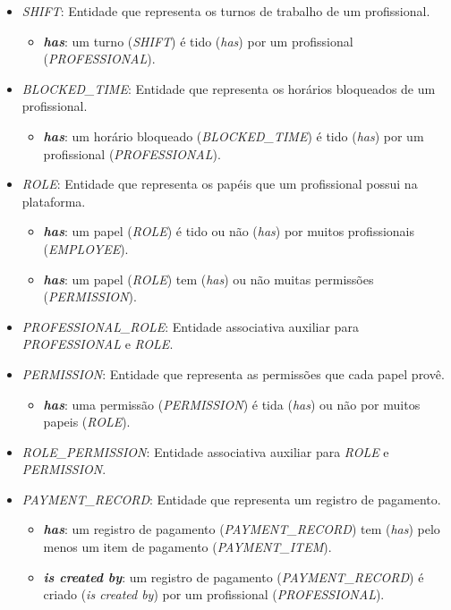 \begin{itemize}
	\item \emph{SHIFT}: Entidade que representa os turnos de trabalho de um profissional.
	\begin{itemize}
		\item \textbf{\textit{has}}: um turno (\emph{SHIFT}) é tido (\textit{has}) por um profissional (\emph{PROFESSIONAL}).
	\end{itemize}
	\item \emph{BLOCKED\_TIME}: Entidade que representa os horários bloqueados de um profissional.
	\begin{itemize}
		\item \textbf{\textit{has}}: um horário bloqueado (\emph{BLOCKED\_TIME}) é tido (\textit{has}) por um profissional (\emph{PROFESSIONAL}).
	\end{itemize}
	\item \emph{ROLE}: Entidade que representa os papéis que um profissional possui na plataforma.
	\begin{itemize}
		\item \textbf{\textit{has}}: um papel (\emph{ROLE}) é tido ou não (\textit{has}) por muitos profissionais (\emph{EMPLOYEE}).
		\item \textbf{\textit{has}}: um papel (\emph{ROLE}) tem (\textit{has}) ou não muitas permissões (\emph{PERMISSION}).
	\end{itemize}
	\item \emph{PROFESSIONAL\_ROLE}: Entidade associativa auxiliar para \emph{PROFESSIONAL} e \emph{ROLE}.
	\item \emph{PERMISSION}: Entidade que representa as permissões que cada papel provê.
	\begin{itemize}
		\item \textbf{\textit{has}}: uma permissão (\emph{PERMISSION}) é tida (\textit{has}) ou não por muitos papeis (\emph{ROLE}).
	\end{itemize}
	\item \emph{ROLE\_PERMISSION}: Entidade associativa auxiliar para \emph{ROLE} e \emph{PERMISSION}.
	\item \emph{PAYMENT\_RECORD}: Entidade que representa um registro de pagamento.
	\begin{itemize}
		\item \textbf{\textit{has}}: um registro de pagamento (\emph{PAYMENT\_RECORD}) tem (\textit{has}) pelo menos um item de pagamento (\emph{PAYMENT\_ITEM}).
		\item \textbf{\textit{is created by}}: um registro de pagamento (\emph{PAYMENT\_RECORD}) é criado (\textit{is created by}) por um profissional (\emph{PROFESSIONAL}).

\end{itemize}
\end{itemize}
